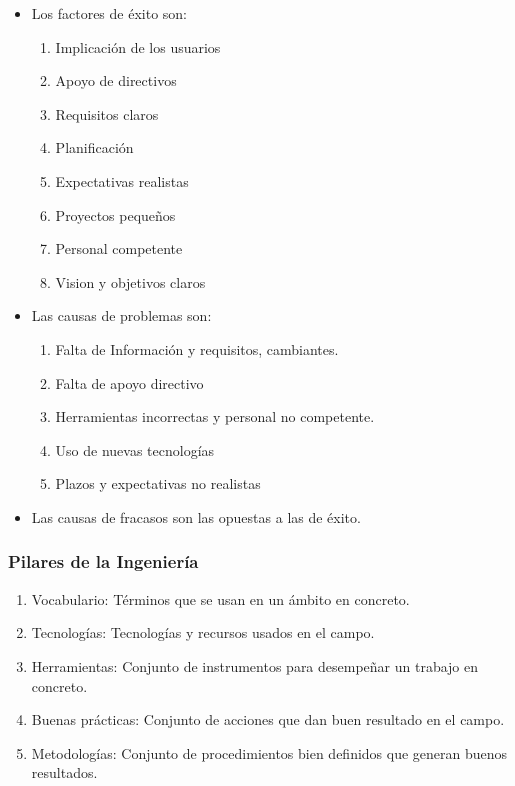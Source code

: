 \begin{itemize}
        \item \color{green}Los factores de éxito \color{black} son:
              \begin{enumerate}
                      \item Implicación de los usuarios
                      \item Apoyo de directivos
                      \item Requisitos claros
                      \item Planificación
                      \item Expectativas realistas
                      \item Proyectos pequeños
                      \item Personal competente
                      \item Vision y objetivos claros
              \end{enumerate}
        \item \color{yellow}Las causas de problemas \color{black} son:
              \begin{enumerate}
                      \item Falta de Información y requisitos, cambiantes.
                      \item Falta de apoyo directivo
                      \item Herramientas incorrectas y personal no competente.
                      \item Uso de nuevas tecnologías
                      \item Plazos y expectativas no realistas
              \end{enumerate}
        \item \color{red}Las causas de fracasos \color{black} son las opuestas a las de éxito.
\end{itemize}
\subsubsection{Pilares de la Ingeniería}
\begin{enumerate}
        \item Vocabulario: Términos que se usan en un ámbito en concreto.
        \item Tecnologías: Tecnologías y recursos usados en el campo.
        \item Herramientas: Conjunto de instrumentos para desempeñar un trabajo en concreto.
        \item Buenas prácticas: Conjunto de acciones que dan buen resultado en el campo.
        \item Metodologías: Conjunto de procedimientos bien definidos que generan buenos resultados.
\end{enumerate}
